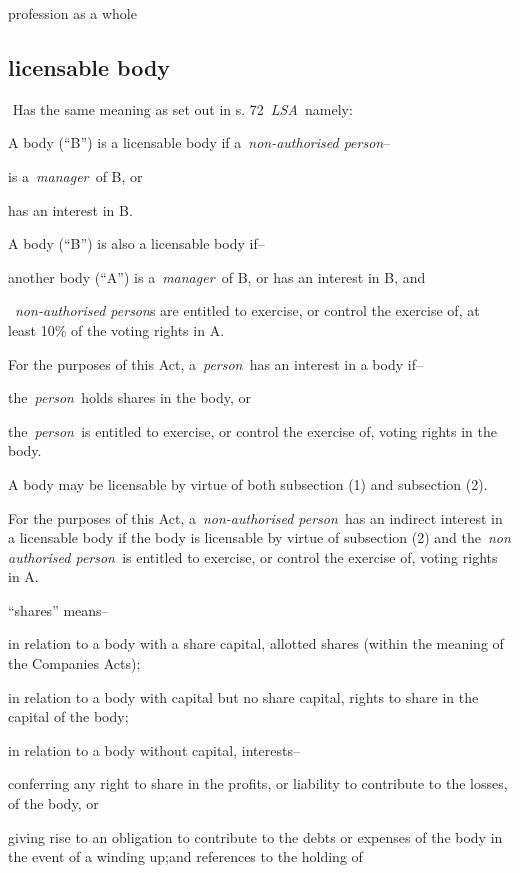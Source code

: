   profession as a whole  \subsection{licensable body } Has the same meaning as set out in s.
  72~\emph{LSA~}namely: \nl \item A body (``B'') is a licensable body if
  a~\emph{non-authorised person}--
\al \item is a~\emph{manager~}of B, or
\item  has an interest in B.\la \item A body (``B'') is also a licensable body if--
 \al \item another body (``A'') is a~\emph{manager~}of B, or has an
  interest in B, and
  \item ~\emph{non-authorised person}s are entitled to
  exercise, or control the exercise of, at least 10\% of the voting
  rights in A.\la
  \item For the purposes of this Act, a~\emph{person~}has an
  interest in a body if--
  \al \item the~\emph{person~}holds shares in the
  body, or
  \item the~\emph{person~}is entitled to exercise, or control the
  exercise of, voting rights in the body. \la \item A body may be licensable
  by virtue of both subsection (1) and subsection (2). \item For the
  purposes of this Act, a~\emph{non-authorised person~}has an indirect
  interest in a licensable body if the body is licensable by virtue of
  subsection (2) and the~\emph{non authorised person~}is entitled to
  exercise, or control the exercise of, voting rights in A. \item
  ``shares'' means-- \al \item in relation to a body with a share capital,
  allotted shares (within the meaning of the Companies Acts); \item in
  relation to a body with capital but no share capital, rights to share
  in the capital of the body; \item in relation to a body without capital,
  interests-- \rl \item conferring any right to share in the profits, or
  liability to contribute to the losses, of the body, or \item giving
  rise to an obligation to contribute to the debts or expenses of the
  body in the event of a winding up;\lr\la and references to the holding of
